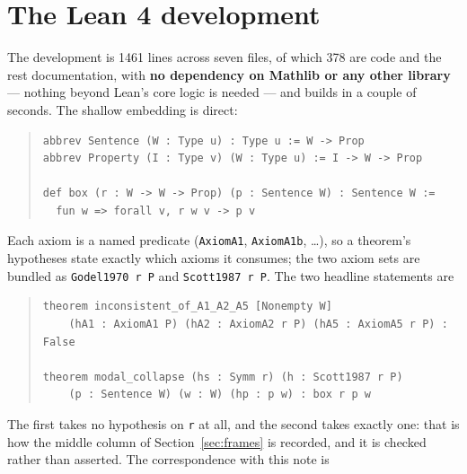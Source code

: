 \documentclass[11pt]{article}
\theoremstyle{plain}
\theoremstyle{definition}
\begin{document}
\section{The Lean 4 development}\label{sec:lean}

The development is 1461 lines across seven files, of which 378 are code and the
rest documentation, with \textbf{no dependency on Mathlib or any other library} --- nothing beyond Lean's core
logic is needed --- and builds in a couple of seconds. The shallow embedding is
direct:

\begin{quote}\small
\begin{verbatim}
abbrev Sentence (W : Type u) : Type u := W -> Prop
abbrev Property (I : Type v) (W : Type u) := I -> W -> Prop

def box (r : W -> W -> Prop) (p : Sentence W) : Sentence W :=
  fun w => forall v, r w v -> p v
\end{verbatim}
\end{quote}

\noindent
Each axiom is a named predicate (\verb|AxiomA1|, \verb|AxiomA1b|, \dots), so a
theorem's hypotheses state exactly which axioms it consumes; the two axiom sets
are bundled as \verb|Godel1970 r P| and \verb|Scott1987 r P|. The two headline
statements are

\begin{quote}\small
\begin{verbatim}
theorem inconsistent_of_A1_A2_A5 [Nonempty W]
    (hA1 : AxiomA1 P) (hA2 : AxiomA2 r P) (hA5 : AxiomA5 r P) : False

theorem modal_collapse (hs : Symm r) (h : Scott1987 r P)
    (p : Sentence W) (w : W) (hp : p w) : box r p w
\end{verbatim}
\end{quote}

\noindent
The first takes no hypothesis on \verb|r| at all, and the second takes exactly
one: that is how the middle column of Section~\ref{sec:frames} is recorded, and
it is checked rather than asserted. The correspondence with this note is
\end{document}
